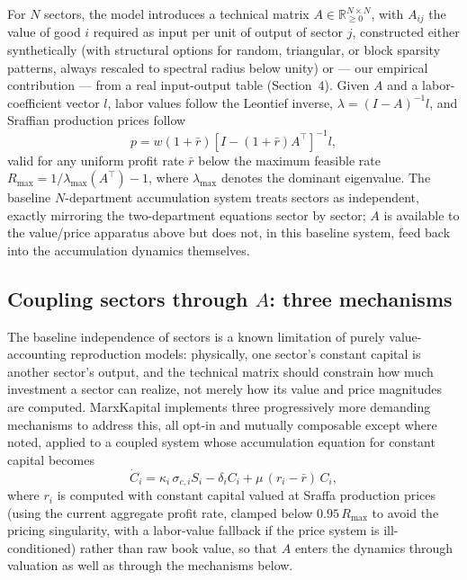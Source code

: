 \documentclass[11pt]{article}
\begin{document}
For $N$ sectors, the model introduces a technical matrix $A\in\mathbb
R^{N\times N}_{\ge 0}$, with $A_{ij}$ the value of good $i$ required as
input per unit of output of sector $j$, constructed either synthetically
(with structural options for random, triangular, or block sparsity
patterns, always rescaled to spectral radius below unity) or --- our
empirical contribution --- from a real input-output table
(Section~4). Given $A$ and a labor-coefficient vector $l$, labor values
follow the Leontief inverse, $\lambda = (I-A)^{-1}l$, and Sraffian
production prices follow
\begin{equation}
  p = w(1+\bar r)\left[I-(1+\bar r)A^\top\right]^{-1} l,
  \label{eq:sraffa}
\end{equation}
valid for any uniform profit rate $\bar r$ below the maximum feasible rate
$R_{\max} = 1/\lambda_{\max}(A^\top) - 1$, where $\lambda_{\max}$ denotes
the dominant eigenvalue. The baseline $N$-department accumulation system
treats sectors as independent, exactly mirroring the two-department
equations sector by sector; $A$ is available to the value/price apparatus
above but does not, in this baseline system, feed back into the
accumulation dynamics themselves.

\subsection{Coupling sectors through $A$: three mechanisms}

The baseline independence of sectors is a known limitation of purely
value-accounting reproduction models: physically, one sector's constant
capital is another sector's output, and the technical matrix should
constrain how much investment a sector can realize, not merely how its
value and price magnitudes are computed. MarxKapital implements three
progressively more demanding mechanisms to address this, all opt-in and
mutually composable except where noted, applied to a coupled system whose
accumulation equation for constant capital becomes
\begin{equation}
  \dot C_i = \kappa_i\,\sigma_{c,i} S_i - \delta_i C_i +
             \mu\,(r_i - \bar r)\, C_i,
  \label{eq:coupled}
\end{equation}
where $r_i$ is computed with constant capital valued at Sraffa production
prices (using the current aggregate profit rate, clamped below
$0.95\,R_{\max}$ to avoid the pricing singularity, with a labor-value
fallback if the price system is ill-conditioned) rather than raw book
value, so that $A$ enters the dynamics through valuation as well as
through the mechanisms below.
\end{document}
